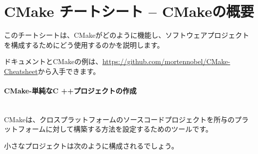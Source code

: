\documentclass[uplatex,11pt,a4paper,landscape,dvipdfmx]{jsarticle} %
\newcommand{\sectiontitle}[1]{\paragraph{#1} \ \\} %
\begin{document}


\section*{CMake チートシート -- CMakeの概要} %



\setlength{\columnsep}{1.5cm}
\begin{multicols}{2}



  
  このチートシートは、CMakeがどのように機能し、ソフトウェアプロジェクトを構成するためにどう使用するのかを説明します。
  
  ドキュメントとCMakeの例は、\url{https://github.com/mortennobel/CMake-Cheatsheet}から入手できます。
 

  \sectiontitle{CMake-単純なC ++プロジェクトの作成}
  

CMakeは、クロスプラットフォームのソースコードプロジェクトを所与のプラットフォームに対して構築する方法を設定するためのツールです。

小さなプロジェクトは次のように構成されるでしょう。

\vspace{\baselineskip} %

\noindent{}


\end{multicols}
\end{document}
